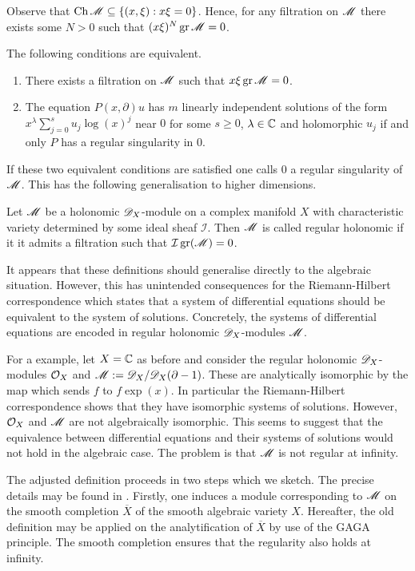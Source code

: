 Observe that $\operatorname{Ch} \mathscr{M}\subseteq \{(x,\xi): x\xi = 0\}$.
Hence, for any filtration on $\mathscr{M}$ there exists some $N>0$ such that
$(x\xi)^N \operatorname{gr}\mathscr{M} = 0 $.
\begin{proposition}
  The following conditions are equivalent.
  \begin{enumerate}
    \item There exists a filtration on $\mathscr{M}$ such that $x\xi\operatorname{gr}\mathscr{M} = 0$.
    \item The equation $P(x,\partial)u$ has $m$ linearly independent solutions of the form $x^\lambda \sum_{j=0}^s u_j \log(x)^j $
    near $0$ for some $s\geq 0$, $\lambda \in \mathbb{C}$ and holomorphic $u_j$ if and only $P$ has a regular singularity in $0$.
  \end{enumerate}
\end{proposition}
If these two equivalent conditions are satisfied one calls $0$ a regular singularity of $\mathscr{M}$.
This has the following generalisation to higher dimensions.
\begin{definition}
   Let $\mathscr{M}$ be a holonomic $\mathscr{D}_X$-module on a complex manifold $X$ with characteristic variety determined by some ideal sheaf $\mathcal{I}$. Then $\mathscr{M}$ is called regular holonomic if it it admits a filtration such that $\mathcal{I} \operatorname{gr}(\mathscr{M}) = 0$.
\end{definition}
It appears that these definitions should generalise directly to the algebraic situation.
However, this has unintended consequences for the Riemann-Hilbert correspondence which states that a system of differential equations should be equivalent to the system of solutions.
Concretely, the systems of differential equations are encoded in regular holonomic $\mathscr{D}_X$-modules $\mathscr{M}$.

For a example, let $X = \mathbb{C}$ as before and consider the regular holonomic $\mathscr{D}_X$-modules $\mathcal{O}_X$ and $\mathscr{M} := \mathscr{D}_X/\mathscr{D}_X(\partial - 1)$.
These are analytically isomorphic by the map which sends $f$ to $f\exp(x)$.
In particular the Riemann-Hilbert correspondence shows that they have isomorphic systems of solutions.
However, $\mathcal{O}_X$ and $\mathscr{M}$ are not algebraically isomorphic.
This seems to suggest that the equivalence between differential equations and their systems of solutions would not hold in the algebraic case.
The problem is that $\mathscr{M}$ is not regular at infinity.

 The adjusted definition proceeds in two steps which we sketch.
 The precise details may be found in \cite[Chapter 7]{borel1987algebraic}.
 Firstly, one induces a module corresponding to $\mathscr{M}$ on the smooth completion $\overline{X}$ of the smooth algebraic variety $X$.
 Hereafter, the old definition may be applied on the analytification of $\overline{X}$ by use of the GAGA principle.
 The smooth completion ensures that the regularity also holds at infinity.
